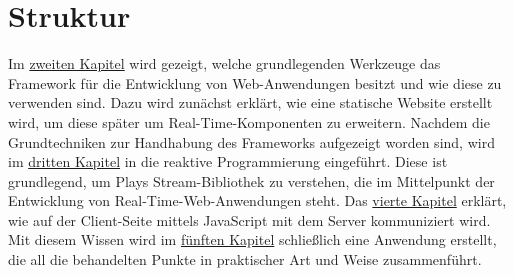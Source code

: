 \section{Struktur} %
\label{sec:struktur}

Im \hyperref[cha:grundlagen]{zweiten Kapitel} wird gezeigt, welche grundlegenden Werkzeuge das Framework für die Entwicklung von Web-Anwendungen besitzt und wie diese zu verwenden sind.
Dazu wird zunächst erklärt, wie eine statische Website erstellt wird, um diese später um Real-Time-Komponenten zu erweitern.
Nachdem die Grundtechniken zur Handhabung des Frameworks aufgezeigt worden sind, wird im \hyperref[cha:reaktive_programmierung]{dritten Kapitel} in die reaktive Programmierung eingeführt.
Diese ist grundlegend, um Plays Stream-Bibliothek zu verstehen, die im Mittelpunkt der Entwicklung von Real-Time-Web-Anwendungen steht.
Das \hyperref[cha:real_time_web]{vierte Kapitel} erklärt, wie auf der Client-Seite mittels JavaScript mit dem Server kommuniziert wird.
Mit diesem Wissen wird im \hyperref[cha:anwendung]{fünften Kapitel} schließlich eine Anwendung erstellt, die all die behandelten Punkte in praktischer Art und Weise zusammenführt.



